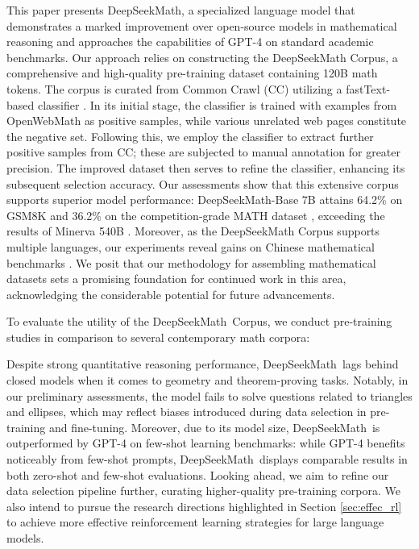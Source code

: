 {This paper presents DeepSeekMath, a specialized language model that demonstrates a marked improvement over open-source models in mathematical reasoning and approaches the capabilities of GPT-4 on standard academic benchmarks. Our approach relies on constructing the DeepSeekMath Corpus, a comprehensive and high-quality pre-training dataset containing 120B math tokens. The corpus is curated from Common Crawl (CC) utilizing a fastText-based classifier \citep{joulin2016fasttext}. In its initial stage, the classifier is trained with examples from OpenWebMath \citep{openwebmath} as positive samples, while various unrelated web pages constitute the negative set. Following this, we employ the classifier to extract further positive samples from CC; these are subjected to manual annotation for greater precision. The improved dataset then serves to refine the classifier, enhancing its subsequent selection accuracy. Our assessments show that this extensive corpus supports superior model performance: DeepSeekMath-Base 7B attains 64.2\% on GSM8K \citep{gsm8k} and 36.2\% on the competition-grade MATH dataset \citep{MATH}, exceeding the results of Minerva 540B \citep{minerva}. Moreover, as the DeepSeekMath Corpus supports multiple languages, our experiments reveal gains on Chinese mathematical benchmarks \citep{wei2023cmath,agieval}. We posit that our methodology for assembling mathematical datasets sets a promising foundation for continued work in this area, acknowledging the considerable potential for future advancements.

To evaluate the utility of the DeepSeekMath~Corpus, we conduct pre-training studies in comparison to several contemporary math corpora:

Despite strong quantitative reasoning performance, DeepSeekMath~lags behind closed models when it comes to geometry and theorem-proving tasks. Notably, in our preliminary assessments, the model fails to solve questions related to triangles and ellipses, which may reflect biases introduced during data selection in pre-training and fine-tuning. Moreover, due to its model size, DeepSeekMath~is outperformed by GPT-4 on few-shot learning benchmarks: while GPT-4 benefits noticeably from few-shot prompts, DeepSeekMath~displays comparable results in both zero-shot and few-shot evaluations. Looking ahead, we aim to refine our data selection pipeline further, curating higher-quality pre-training corpora. We also intend to pursue the research directions highlighted in Section \ref{sec:effec_rl} to achieve more effective reinforcement learning strategies for large language models.

}
